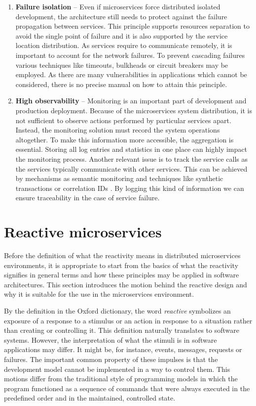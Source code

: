 \documentclass[oneside,
  digital, %
  table,   %
  nolof,     %
  nolot,     %
]{fithesis3}
\begin{document}
\begin{enumerate}
	\item \textbf{Failure isolation} -- Even if microservices force distributed isolated development, the architecture still needs to protect against the failure propagation between services. This principle supports resources separation to avoid the single point of failure and it is also supported by the service location distribution. As services require to communicate remotely, it is important to account for the network failures. To prevent cascading failures various techniques like timeouts, bulkheads or circuit breakers \cite{release_it} may be employed. As there are many vulnerabilities in applications which cannot be considered, there is no precise manual on how to attain this principle.
	
	\item \textbf{High observability} -- Monitoring is an important part of development and production deployment. Because of the microservices system distribution, it is not sufficient to observe actions performed by particular services apart. Instead, the monitoring solution must record the system operations altogether. To make this information more accessible, the aggregation is essential. Storing all log entries and statistics in one place can highly impact the monitoring process. Another relevant issue is to track the service calls as the services typically communicate with other services. This can be achieved by mechanisms as semantic monitoring and techniques like synthetic transactions or correlation IDs \cite{building_ms}. By logging this kind of information we can ensure traceability in the case of service failure.
	
\end{enumerate}

\section{Reactive microservices}

Before the definition of what the reactivity means in distributed microservices environments, it is appropriate to start from the basics of what the reactivity signifies in general terms and how these principles may be applied in software architectures. This section introduces the motion behind the reactive design and why it is suitable for the use in the microservices environment.

By the definition in the Oxford dictionary, the word \textit{reactive} symbolizes an exposure of a response to a stimulus or an action in response to a situation rather than creating or controlling it. This definition naturally translates to software systems. However, the interpretation of what the stimuli is in software applications may differ. It might be, for instance, events, messages, requests or failures. The important common property of these impulses is that the development model cannot be implemented in a way to control them. This motions differ from the traditional style of programming models in which the program functioned as a sequence of commands that were always executed in the predefined order and in the maintained, controlled state.
\end{document}
